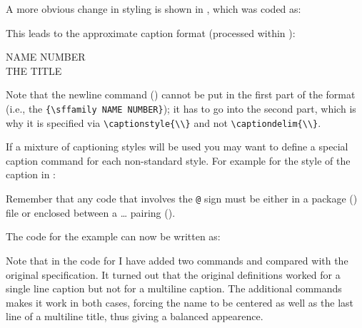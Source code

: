  A more obvious change in styling is shown in ,
 which was coded as:
This leads to the approximate caption format 
(processed within \cmd{\centering}): 
\begin{lcode}
{\sffamily NAME NUMBER}{\\ \scshape THE TITLE}
\end{lcode}
 Note that the newline command (\cmd{\\}) cannot be put in the first part
 of the format (i.e., the \verb?{\sffamily NAME NUMBER}?); it has to go into
 the second part, which is why it is specified via \verb?\captionstyle{\\}?
 and not \verb?\captiondelim{\\}?.

    If a mixture of captioning styles will be used you may want to
define a special caption command for each non-standard style. For
example for the style of the caption in :
\begin{lcode}
\newcommand{\mycaption}[2][\@empty]{
  \captionnamefont{\sffamily\hfill}
  \captiondelim{\hfill}
  \captionstyle{\centerlastline\\}
  \captiontitlefont{\scshape}
  \setlength{\belowcaptionskip}{10pt}
  \ifx \@empty#1 \caption{#2}\else \caption[#1]{#2}\fi}
\end{lcode}
Remember that any code that involves the \idxatincode\texttt{@} sign must 
be either in
a package () file or enclosed between a \cmd{\makeatletter} \ldots
\cmd{\makeatother} pairing (\seeatincode).

 The code for the  example can now be written as:
 Note that in the code for  I have added two
\cmd{\hfill} commands and \cmd{\centerlastline} compared with the original
specification.
It turned out that the original definitions
worked for a single line caption but not for a 
multiline caption.
The additional commands makes it work in both cases, forcing the
name to be centered as well as the last line of a multiline title,
thus giving a balanced appearence.

